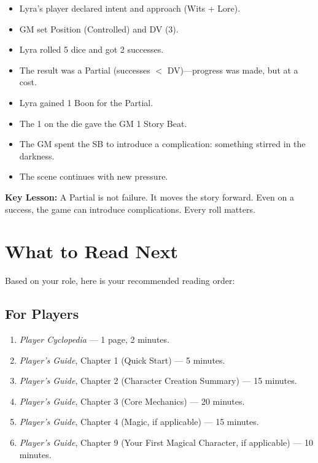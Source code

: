 \documentclass[10pt]{article}
\begin{document}
\begin{itemize}
\item Lyra's player declared intent and approach (Wits + Lore).
\item GM set Position (Controlled) and DV (3).
\item Lyra rolled 5 dice and got 2 successes.
\item The result was a Partial (successes $<$ DV)---progress was made, but at a cost.
\item Lyra gained 1 Boon for the Partial.
\item The 1 on the die gave the GM 1 Story Beat.
\item The GM spent the SB to introduce a complication: something stirred in the darkness.
\item The scene continues with new pressure.
\end{itemize}

\vspace{0.5cm}
\begin{tipbox}
\textbf{Key Lesson:} A Partial is not failure. It moves the story forward. Even on a success, the game can introduce complications. Every roll matters.
\end{tipbox}

\newpage

\section*{What to Read Next}

Based on your role, here is your recommended reading order:

\subsection*{For Players}

\begin{enumerate}
\item \textit{Player Cyclopedia} --- 1 page, 2 minutes.
\item \textit{Player's Guide}, Chapter 1 (Quick Start) --- 5 minutes.
\item \textit{Player's Guide}, Chapter 2 (Character Creation Summary) --- 15 minutes.
\item \textit{Player's Guide}, Chapter 3 (Core Mechanics) --- 20 minutes.
\item \textit{Player's Guide}, Chapter 4 (Magic, if applicable) --- 15 minutes.
\item \textit{Player's Guide}, Chapter 9 (Your First Magical Character, if applicable) --- 10 minutes.
\end{enumerate}
\end{document}
